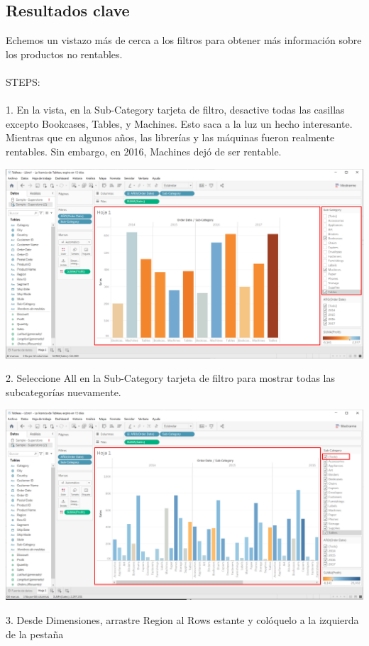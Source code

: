 \documentclass[12pt,letterpaper]{article}
\begin{document}
\subsection{Resultados clave}
Echemos un vistazo más de cerca a los filtros para obtener más información sobre los productos no
rentables.
\\\\STEPS:
\\\\1. En la vista, en la Sub-Category tarjeta de filtro, desactive todas las casillas
excepto Bookcases, Tables, y Machines. Esto saca a la luz un hecho interesante. Mientras
que en algunos años, las librerías y las máquinas fueron realmente rentables. Sin embargo, en
2016, Machines dejó de ser rentable.
\begin{center}
    \includegraphics[width=16cm]{img/14.png}  
\end{center}
2. Seleccione All en la Sub-Category tarjeta de filtro para mostrar todas las subcategorías
nuevamente.
\begin{center}
    \includegraphics[width=16cm]{img/15.png}  
\end{center}
3. Desde Dimensiones, arrastre Region al Rows estante y colóquelo a la izquierda de la pestaña
\end{document}
